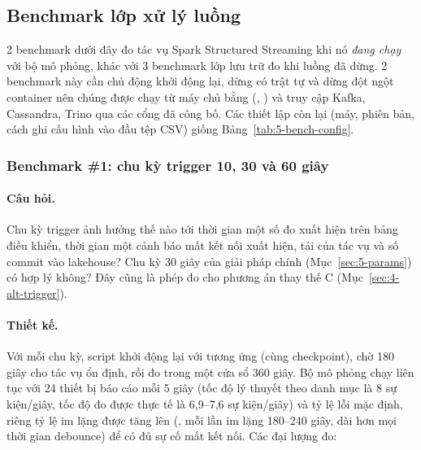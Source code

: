 \subsection{Benchmark lớp xử lý luồng}
\label{sec:5-bench-stream}

2 benchmark dưới đây đo tác vụ Spark Structured Streaming khi nó \emph{đang chạy} với bộ mô phỏng, khác với 3 benchmark lớp lưu trữ đo khi luồng đã dừng. 2 benchmark này cần chủ động khởi động lại, dừng có trật tự và dừng đột ngột container  nên chúng được chạy từ máy chủ bằng  (, ) và truy cập Kafka, Cassandra, Trino qua các cổng đã công bố. Các thiết lập còn lại (máy, phiên bản, cách ghi cấu hình vào đầu tệp CSV) giống Bảng~\ref{tab:5-bench-config}.

\subsubsection{Benchmark \#1: chu kỳ trigger 10, 30 và 60 giây}
\label{sec:5-bench-trigger}

\paragraph{Câu hỏi.} Chu kỳ trigger ảnh hưởng thế nào tới thời gian một số đo xuất hiện trên bảng điều khiển, thời gian một cảnh báo mất kết nối xuất hiện, tải của tác vụ và số commit vào lakehouse? Chu kỳ 30 giây của giải pháp chính (Mục~\ref{sec:5-params}) có hợp lý không? Đây cũng là phép đo cho phương án thay thế C (Mục~\ref{sec:4-alt-trigger}).

\paragraph{Thiết kế.} Với mỗi chu kỳ, script khởi động lại  với  tương ứng (cùng checkpoint), chờ 180 giây cho tác vụ ổn định, rồi đo trong một cửa sổ 360 giây. Bộ mô phỏng chạy liên tục với 24 thiết bị báo cáo mỗi 5 giây (tốc độ lý thuyết theo danh mục là 8 sự kiện/giây, tốc độ đo được thực tế là 6,9--7,6 sự kiện/giây) và tỷ lệ lỗi mặc định, riêng tỷ lệ im lặng được tăng lên (, mỗi lần im lặng 180--240 giây, dài hơn mọi thời gian debounce) để có đủ sự cố mất kết nối. Các đại lượng đo:

